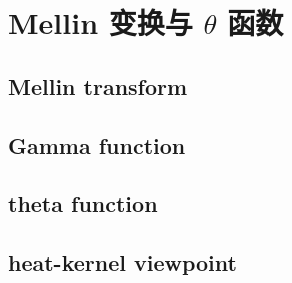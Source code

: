 \section{Mellin 变换与 \texorpdfstring{\(\theta\)}{θ} 函数}
\label{b3:sec:2602}


\subsection{Mellin transform}
\label{b3:subsec:260201}

\subsection{Gamma function}
\label{b3:subsec:260202}

\subsection{theta function}
\label{b3:subsec:260203}

\subsection{heat-kernel viewpoint}
\label{b3:subsec:260204}


